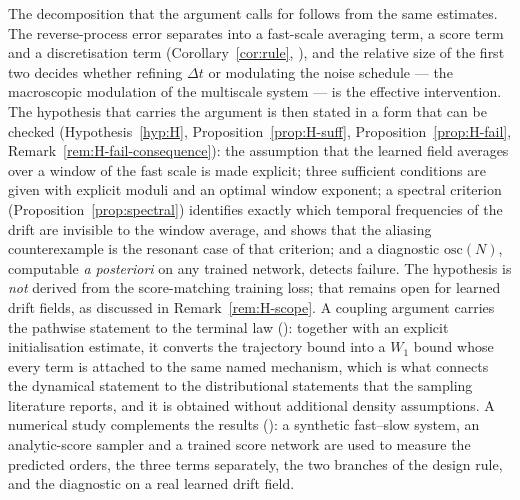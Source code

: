 \documentclass[a4paper,fleqn]{cas-dc}
\theoremstyle{definition}
\begin{document}
The decomposition that the argument calls for follows from the same estimates. The
reverse-process error separates into a fast-scale averaging term, a score term and a
discretisation term (Corollary~\ref{cor:rule}, ), and the relative
size of the first two decides whether refining $\Delta t$ or modulating the noise
schedule --- the macroscopic modulation of the multiscale system --- is the effective
intervention. The hypothesis that carries the argument is then stated in a form that
can be checked (Hypothesis~\ref{hyp:H}, Proposition~\ref{prop:H-suff},
Proposition~\ref{prop:H-fail}, Remark~\ref{rem:H-fail-consequence}): the assumption
that the learned field averages over a window of the fast scale is made explicit;
three sufficient conditions are given with explicit moduli and an optimal window
exponent; a spectral criterion (Proposition~\ref{prop:spectral}) identifies exactly
which temporal frequencies of the drift are invisible to the window average, and shows
that the aliasing counterexample is the resonant case of that criterion; and a
diagnostic $\mathrm{osc}(N)$, computable \emph{a posteriori} on any trained network,
detects failure. The hypothesis is \emph{not} derived from the score-matching training
loss; that remains open for learned drift fields, as discussed in
Remark~\ref{rem:H-scope}. A coupling argument carries the pathwise statement to the
terminal law (): together with an explicit initialisation estimate, it
converts the trajectory bound into a $W_{1}$ bound whose every term is attached to the
same named mechanism, which is what connects the dynamical statement to the
distributional statements that the sampling literature reports, and it is obtained
without additional density assumptions. A numerical study complements the results
(): a synthetic fast--slow system, an analytic-score sampler and a
trained score network are used to measure the predicted orders, the three terms
separately, the two branches of the design rule, and the diagnostic on a real learned
drift field.
\end{document}
